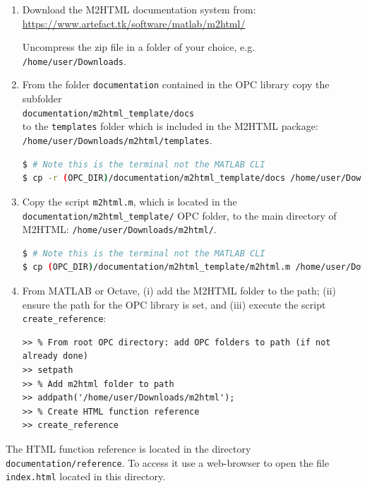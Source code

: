 \documentclass{book}
\begin{document}
\begin{enumerate}

\item Download the M2HTML documentation system from:
%
\url{https://www.artefact.tk/software/matlab/m2html/}

Uncompress the zip file in a folder of your choice, e.g.
{\tt /home/user/Downloads}.

\item From the folder {\tt documentation} contained in the OPC library copy the subfolder\\
{\tt documentation/m2html\_template/docs}\\
%
to the {\tt templates} folder which is included in the M2HTML package:\\
{\tt /home/user/Downloads/m2html/templates}.

\begin{lstlisting}[language=Bash]
$ # Note this is the terminal not the MATLAB CLI
$ cp -r (OPC_DIR)/documentation/m2html_template/docs /home/user/Downloads/m2html/templates/
\end{lstlisting}


\item Copy the script
{\tt m2html.m}, which is located in the {\tt documentation/m2html\_template/} OPC folder,
to the main directory of M2HTML: 
{\tt /home/user/Downloads/m2html/}.

\begin{lstlisting}[language=Bash]
$ # Note this is the terminal not the MATLAB CLI
$ cp (OPC_DIR)/documentation/m2html_template/m2html.m /home/user/Downloads/m2html/
\end{lstlisting}

\item From MATLAB or Octave, (i) add the M2HTML folder to the path;
(ii) ensure the path for the OPC library is set, and (iii) execute
the script {\tt create\_reference}:

\begin{lstlisting}
>> % From root OPC directory: add OPC folders to path (if not already done)
>> setpath
>> % Add m2html folder to path
>> addpath('/home/user/Downloads/m2html');
>> % Create HTML function reference
>> create_reference
\end{lstlisting}

\end{enumerate}

\noindent
%
The HTML function reference is located in the directory {\tt
documentation/reference}.  To access it use a web-browser to open the file {\tt
index.html} located in this directory.
\end{document}
